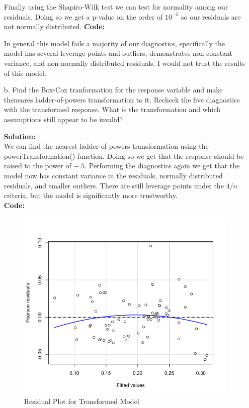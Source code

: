 \documentclass[12pt]{article}
\makeatletter
\theoremstyle{homework}
\newenvironment{exercise}[1]
{\def\@currentlabel{#1}\exercisecore}
{\endexercisecore}
\newcommand{\localhead}[1]{\par\smallskip\noindent\textbf{#1}\nobreak\\}%
\newcommand\solution{\localhead{Solution:}}
\makeatother
\begin{document}
\begin{exercise}{1}
\begin{enumerate}
      Finally using the Shapiro-Wilk test we can test for normality among our residuals. Doing so we get a p-value on the 
      order of $10^{-5}$ so our residuals are not normally distributed.
      \textbf{Code:}
      \begin{center}
      
      \end{center} 
      In general this model fails a majority of our diagnostics, specifically the model has several leverage points and outliers, demonstrates 
      non-constant variance, and non-normally distributed residuals. I would not trust the results of this model. 
      \newpage

      \item[b.] Find the Box-Cox tranformation for the response variable and make theneares ladder-of-powers transformation 
      to it. Recheck the five diagnostics with the transformed response. What is the transformation and which assumptions still appear to be 
      invalid?\\
      \solution We can find the nearest ladder-of-powers transformation using the powerTransformation() function. Doing so we get that the response should be 
      raised to the power of $-.5$. Performing the diagnostics again we get that the model now has constant variance in the residuals, normally distributed residuals, and smaller outliers. There 
      are still leverage points under the $4/n$ criteria, but the model is significantly more trustworthy. \\
      \textbf{Code:}
      \begin{center}
      
      \end{center} 
      \begin{figure}[H]
        \begin{center}
        \caption{Residual Plot for Transformed Model}
        \includegraphics[width = \textwidth]{Rplot04.png}

\end{center}
\end{figure}
\end{enumerate}
\end{exercise}
\end{document}
